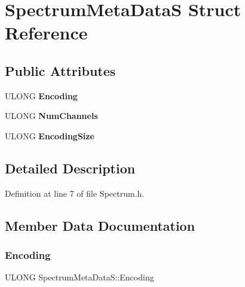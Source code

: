 \hypertarget{struct_spectrum_meta_data_s}{}\section{Spectrum\+Meta\+DataS Struct Reference}
\label{struct_spectrum_meta_data_s}
\subsection*{Public Attributes}
\begin{DoxyCompactItemize}
\item 
\mbox{\label{struct_spectrum_meta_data_s_afb4aabd82e43317ac570576dfc58531c}} 
U\+L\+O\+NG {\bfseries Encoding}
\item 
\mbox{\label{struct_spectrum_meta_data_s_a745f4e9d81b2f20409f2100ca5dfd3b8}} 
U\+L\+O\+NG {\bfseries Num\+Channels}
\item 
\mbox{\label{struct_spectrum_meta_data_s_a5973d9cdcf2fd879d59b0c6572d5e27d}} 
U\+L\+O\+NG {\bfseries Encoding\+Size}
\end{DoxyCompactItemize}


\subsection{Detailed Description}


Definition at line 7 of file Spectrum.\+h.



\subsection{Member Data Documentation}
\mbox{\label{struct_spectrum_meta_data_s_afb4aabd82e43317ac570576dfc58531c}} 
\subsubsection{\texorpdfstring{Encoding}{Encoding}}
{\footnotesize\ttfamily U\+L\+O\+NG Spectrum\+Meta\+Data\+S\+::\+Encoding}



